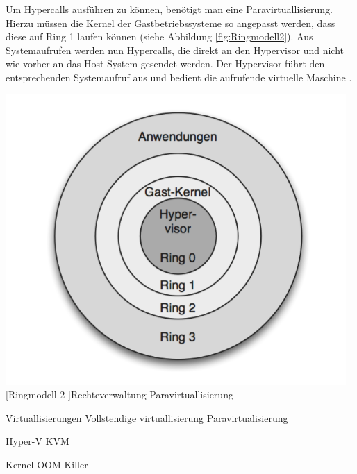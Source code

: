  
 
 Um Hypercalls ausführen zu können, benötigt man eine Paravirtuallisierung. Hierzu müssen die Kernel der Gastbetriebssysteme so angepasst werden, dass diese auf Ring 1 laufen können (siehe Abbildung \ref{fig:Ringmodell2}). Aus Systemaufrufen werden nun Hypercalls, die direkt an den Hypervisor und nicht wie vorher an das Host-System gesendet werden. Der Hypervisor führt den entsprechenden Systemaufruf aus und bedient die aufrufende virtuelle Maschine \cite{Meinel2011VirtualisierungMarktubersicht}.



 \vspace{1em}
\begin{minipage}{\linewidth}
	\centering
	\includegraphics[width=0.5\linewidth]{pics/Ringmodell2.PNG}
	[Ringmodell 2 ]{Rechteverwaltung Paravirtuallisierung \cite{Meinel2011VirtualisierungMarktubersicht} }
	\label{fig:Ringmodell2}
\end{minipage}
 





Virtuallisierungen
Vollstendige virtuallisierung 
Paravirtualisierung

Hyper-V
KVM

Kernel
OOM Killer

